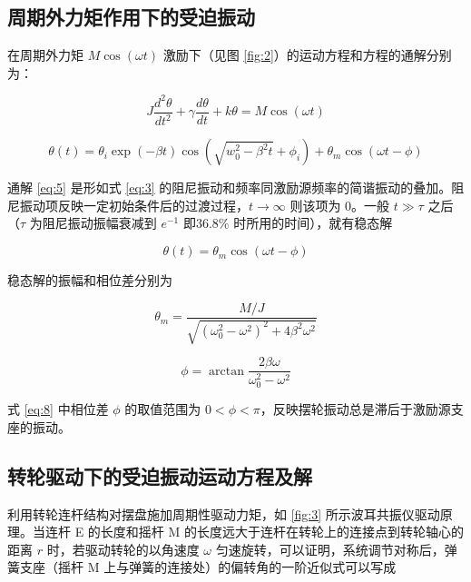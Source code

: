 \documentclass[12pt,a4paper]{amsart}
\begin{document}
\subsection{周期外力矩作用下的受迫振动}

在周期外力矩 $M\cos(\omega t)$ 激励下（见图 \ref{fig:2}）的运动方程和方程的通解分别为：

\begin{equation}
    J\frac{d^2\theta}{dt^2} + \gamma\frac{d\theta}{dt} + k\theta = M\cos(\omega t) \label{eq:4}
\end{equation}

\begin{equation}
    \theta(t) = \theta_i \exp(-\beta t) \cos(\sqrt{w_0^2-\beta^2 t} + \phi_i) + \theta_m \cos(\omega t - \phi) \label{eq:5}
\end{equation}

通解 \ref{eq:5} 是形如式 \ref{eq:3} 的阻尼振动和频率同激励源频率的简谐振动的叠加。阻尼振动项反映一定初始条件后的过渡过程，$t \rightarrow \infty$ 则该项为 0。一般 $t \gg \tau$ 之后（$\tau$ 为阻尼振动振幅衰减到 $e^{-1}$ 即36.8\% 时所用的时间），就有稳态解

\begin{equation}
    \theta(t) = \theta_m \cos(\omega t - \phi) \label{eq:6}
\end{equation}

稳态解的振幅和相位差分别为

\begin{equation}
    \theta_m = \frac{M/J}{\sqrt{(\omega_0^2 - \omega^2)^2 + 4\beta^2\omega^2}} \label{eq:7}
\end{equation}

\begin{equation}
    \phi = \arctan\frac{2\beta\omega}{\omega_0^2 - \omega^2} \label{eq:8}
\end{equation}

式 \ref{eq:8} 中相位差 $\phi$ 的取值范围为 $0 < \phi < \pi$，反映摆轮振动总是滞后于激励源支座的振动。

\subsection{转轮驱动下的受迫振动运动方程及解}

利用转轮连杆结构对摆盘施加周期性驱动力矩，如 \ref{fig:3} 所示波耳共振仪驱动原理。当连杆 E 的长度和摇杆 M 的长度远大于连杆在转轮上的连接点到转轮轴心的距离 $r$ 时，若驱动转轮的以角速度 $\omega$ 匀速旋转，可以证明，系统调节对称后，弹簧支座（摇杆 M 上与弹簧的连接处）的偏转角的一阶近似式可以写成
\end{document}

